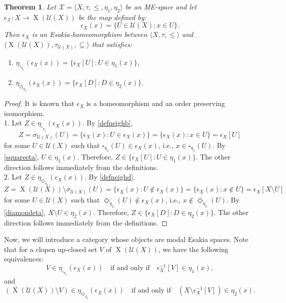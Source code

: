 \documentclass[pdflatex,sn-mathphys-num]{sn-jnl}%
\newcommand{\X}[1]{\operatorname{X}(#1)}
\theoremstyle{thmstyleone}%
\newtheorem{theorem}{Theorem}%
\theoremstyle{thmstyletwo}%
\theoremstyle{thmstylethree}%
\begin{document}
\begin{theorem}\label{natep}
    Let $\mathcal{X}=\langle X,\tau,\leq,\eta_1,\eta_2\rangle$ be an ME-space and let $\epsilon_\mathcal{X}\colon X\to\X{\mathcal{U}(X)}$ be the map defined by:
    \[\epsilon_X(x)=\{U\in\mathcal{U}(X):x\in U\}.\]
    Then $\epsilon_X$ is an Esakia-homeomorphism between $\langle X,\tau,\leq\rangle$ and $\langle \X{\mathcal{U}(X)},\tau_{\mathcal{U}(X)},\subseteq\rangle$ that satisfies:
    \begin{enumerate}
        \item $\eta_{\square_{\eta_1}}(\epsilon_X(x))=\{\epsilon_X[U]:U\in\eta_1(x)\}$,
        \item $\eta_{\Diamond_{\eta_2}}(\epsilon_X(x))=\{\epsilon_X[D]:D\in\eta_2(x)\}$.
    \end{enumerate}
\end{theorem}
\begin{proof} It is known that $\epsilon_X$ is a homeomorphism and an order preserving isomorphism.\\
    1. Let $Z\in \eta_{\square_{\eta_1}}(\epsilon_X(x))$. By \eqref{defneighb}, $$Z=\sigma_{\mathcal{U}(X)}(U)=\{\epsilon_X(x): U\in \epsilon_X(x)
    \}=\{\epsilon_X(x): x\in U
    \}=\epsilon_X[U]$$ for some $U\in\mathcal{U}(X)$ such that $\square_{\eta_1}(U)\in \epsilon_X(x)$, i.e., $x\in \square_{\eta_1}(U)$. By \eqref{squareeta}, $U\in\eta_1(x)$. Therefore, $Z\in \{\epsilon_X[U]:U\in\eta_1(x)\}$. The other direction follows immediately from the definitions.\\
    2. Let $Z\in \eta_{\Diamond_{\eta_2}}(\epsilon_X(x))$. By \eqref{defneighd}, $$Z=\X{\mathcal{U}(X)}\setminus\sigma_{\mathcal{U}(X)}(U)=\{\epsilon_X(x): U\notin \epsilon_X(x)
    \}=\{\epsilon_X(x): x\notin U
    \}=\epsilon_X[X\setminus U]$$ for some $U\in\mathcal{U}(X)$ such that $\Diamond_{\eta_2}(U)\notin \epsilon_X(x)$, i.e., $x\notin \Diamond_{\eta_2}(U)$. By \eqref{diamondeta}, $X\setminus U\in\eta_2(x)$. Therefore, $Z\in \{\epsilon_X[D]:D\in\eta_2(x)\}$. The other direction follows immediately from the definitions.
\end{proof}

Now, we will introduce a category whose objects are modal Esakia spaces. Note that for a clopen up-closed set $V$ of $\X{\mathcal{U}(X)}$, we have the following equivalences:
\[
V \in \eta_{\square_{\eta_1}}(\epsilon_X(x)) \quad \text{if and only if} \quad \epsilon_X^{-1}[V] \in \eta_1(x),
\]
and
\[
(\X{\mathcal{U}(X)}\setminus V)\in \eta_{\Diamond_{\eta_2}}(\epsilon_X(x)) \quad \text{if and only if} \quad (X \setminus \epsilon_X^{-1}[V]) \in \eta_2(x).
\]
\end{document}
